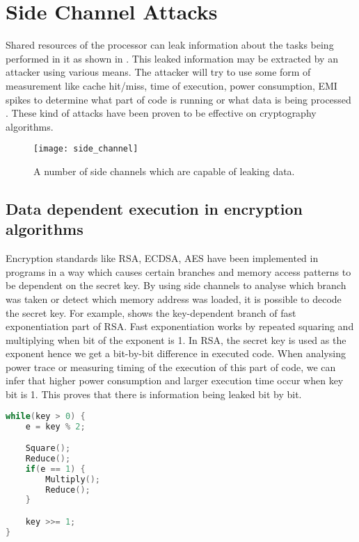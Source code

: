 \chapter{Side Channel Attacks}

Shared resources of the processor can leak information about the tasks
being performed in it as shown in .
This leaked information may be extracted by an attacker using
various means. The attacker will try to use some form of measurement like
cache hit/miss, time of execution, power consumption, EMI spikes to determine
what part of code is running or what data is being processed
. These kind of attacks have been proven to be effective
on cryptography algorithms.

\begin{figure}[h]
    \centering
    \texttt{[image: side\_channel]}
    \caption[Data leakage sources]{A number of side channels
    which are capable of leaking data.}
    \label{fig:dls}
\end{figure}

\section{Data dependent execution in encryption algorithms}

Encryption standards like RSA, ECDSA, AES have been implemented in programs in
a way which causes certain branches and memory access patterns to be dependent
on the secret key. By using side channels to analyse which branch was taken or
detect which memory address was loaded, it is possible to decode the secret
key. For example,  shows the key-dependent branch of fast
exponentiation part of RSA. Fast exponentiation works by repeated squaring and
multiplying when bit of the exponent is 1. In RSA, the secret key is used as
the exponent hence we get a bit-by-bit difference in executed code. When
analysing power trace or measuring timing of the execution of this part of
code, we can infer that higher power consumption and larger execution time
occur when key bit is 1. This proves that there is information being leaked
bit by bit.

\begin{lstlisting}[caption={Key-dependent branch of fast
exponentiation used in RSA},label={lst:kdrsa},language={C}]
while(key > 0) {
    e = key % 2;

    Square();
    Reduce();
    if(e == 1) {
        Multiply();
        Reduce();
    }

    key >>= 1;
}
\end{lstlisting}

